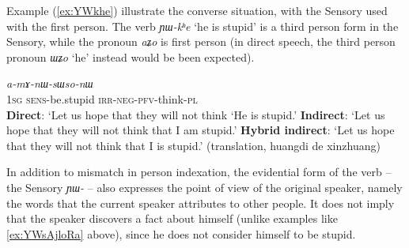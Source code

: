 \documentclass[11pt]{article}
\newcommand{\ipa}[1]{{\phon\textit{#1}}} %
\newcommand{\refb}[1]{(\ref{#1})}
\newcommand{\bleu}[1]{{\color{blue}#1}}
\newcommand{\rouge}[1]{{\color{red}#1}}
\begin{document}


Example \refb{ex:YWkhe} illustrate the converse situation, with the Sensory used with the first person. The verb \ipa{ɲɯ-kʰe} `he is stupid' is a third person form in the Sensory, while the pronoun \ipa{aʑo} is first person (in direct speech, the third person pronoun \ipa{ɯʑo} `he' instead would be been expected).

 \begin{exe}
\ex \label{ex:YWkhe}
 \gll
\rouge{\ipa{aʑo}} 	\bleu{\ipa{ɲɯ-kʰe}} 	\ipa{a-mɤ-nɯ-sɯso-nɯ} \\
\rouge{\textsc{1sg}} \bleu{\textsc{sens}-be.stupid} \textsc{irr-neg-pfv}-think-\textsc{pl}  \\
\glt  \textbf{Direct}: `Let us hope that they will not think `\bleu{He is stupid}.'
\glt  \textbf{Indirect}:  `Let us hope that they will not think that \rouge{I am stupid}.'
\glt  \textbf{Hybrid indirect}: `Let us hope that they will not think that \rouge{I} \bleu{is stupid}.' (translation, huangdi de xinzhuang)
\end{exe}

In addition to mismatch in person indexation, the evidential form of the verb -- the Sensory \ipa{ɲɯ-} -- also expresses the point of view of the original speaker, namely the words that the current speaker attributes to other people. It does not imply that the speaker discovers a fact about himself (unlike examples like \ref{ex:YWsAjloRa} above), since he does not consider himself to be stupid.
\end{document}
